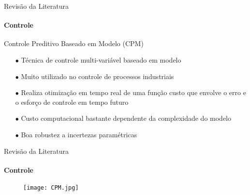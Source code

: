 \documentclass[25pt,landscape]{beamer}
\begin{document}
\begin{frame}{Revisão da Literatura}
    \framesubtitle{Controle}
    \begin{block}{Controle Preditivo Baseado em Modelo (CPM)}
        \begin{itemize}
            \item[$\bullet$] Técnica de controle multi-variável baseado em modelo \\[8pt]
            \item[$\bullet$] Muito utilizado no controle de processos industriais \\[8pt]
            \item[$\bullet$] Realiza otimização em tempo real de uma função custo que envolve o erro e o esforço de controle em tempo futuro \\[8pt]
            \item[$\bullet$] Custo computacional bastante dependente da complexidade do modelo \\[8pt]
            \item[$\bullet$] Boa robustez a incertezas paramétricas  \\[8pt]
        \end{itemize}
    \end{block}
\end{frame}

\begin{frame}{Revisão da Literatura}
    \framesubtitle{Controle}
    \begin{figure}[!h]
        \centering
        \texttt{[image: CPM.jpg]}
    \end{figure}  
\end{frame}
\end{document}

